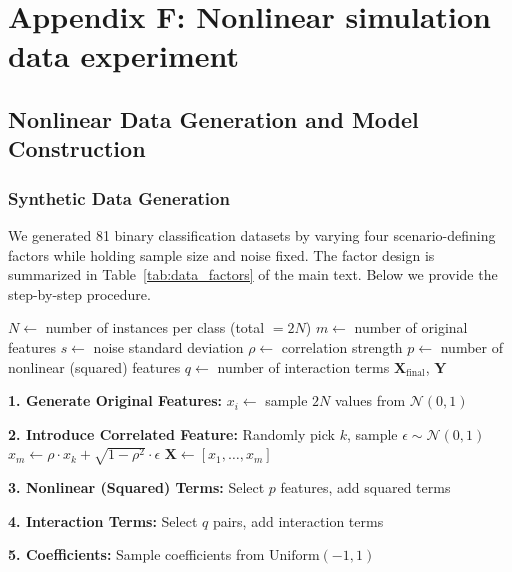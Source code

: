 \documentclass[mnsc,blindrev]{informs3}
\begin{document}
\section*{Appendix F: Nonlinear simulation data experiment}

\subsection{Nonlinear Data Generation and Model Construction}
\label{app:nonlinear_data_generation}

\subsubsection{Synthetic Data Generation}
\noindent
We generated 81 binary classification datasets by varying four scenario-defining factors while holding sample size and noise fixed. The factor design is summarized in Table~\ref{tab:data_factors} of the main text. Below we provide the step-by-step procedure.

\begin{algorithm}[H]
\caption{Generating Synthetic Dataset}
\label{alg:synth-data}
\begin{algorithmic}[1]
\Require 
    \Statex $N \gets$ number of instances per class (total $= 2N$)
    \Statex $m \gets$ number of original features
    \Statex $s \gets$ noise standard deviation
    \Statex $\rho \gets$ correlation strength
    \Statex $p \gets$ number of nonlinear (squared) features
    \Statex $q \gets$ number of interaction terms
\Ensure 
    \Statex $\mathbf{X}_\text{final}$, $\mathbf{Y}$

\Statex \textbf{1. Generate Original Features:}
        \State $x_i \gets$ sample $2N$ values from $\mathcal{N}(0,1)$
    \EndFor

\Statex \textbf{2. Introduce Correlated Feature:}
    \State Randomly pick $k$, sample $\epsilon \sim \mathcal{N}(0,1)$
    \State $x_m \gets \rho \cdot x_k + \sqrt{1-\rho^2}\cdot\epsilon$
    \State $\mathbf{X} \gets [x_1,\ldots,x_m]$

\Statex \textbf{3. Nonlinear (Squared) Terms:}
    \State Select $p$ features, add squared terms

\Statex \textbf{4. Interaction Terms:}
    \State Select $q$ pairs, add interaction terms

\Statex \textbf{5. Coefficients:}
    \State Sample coefficients from $\text{Uniform}(-1,1)$
\end{algorithmic}
\end{algorithm}
\end{document}
